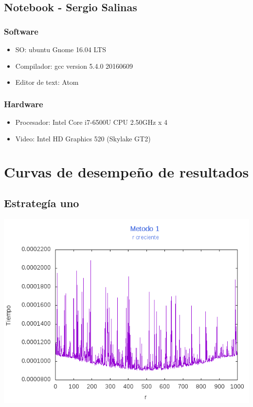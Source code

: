 \documentclass[12pt,letterpaper]{scrartcl}
\begin{document}
\subsection{Notebook - Sergio Salinas}
\subsubsection{Software}
\begin{itemize}
\item  SO: ubuntu Gnome 16.04 LTS
\item Compilador: gcc version 5.4.0 20160609 
\item Editor de text: Atom
\end{itemize}

\subsubsection{Hardware}
\begin{itemize}
\item Procesador: Intel Core i7-6500U CPU  2.50GHz x 4 
\item Video: Intel HD Graphics 520 (Skylake GT2) 
\end{itemize}




\section{Curvas de desempeño de resultados}

\subsection{Estrategía uno}

\includegraphics[scale=1]{Metodo1/plot1m1}
\end{document}
